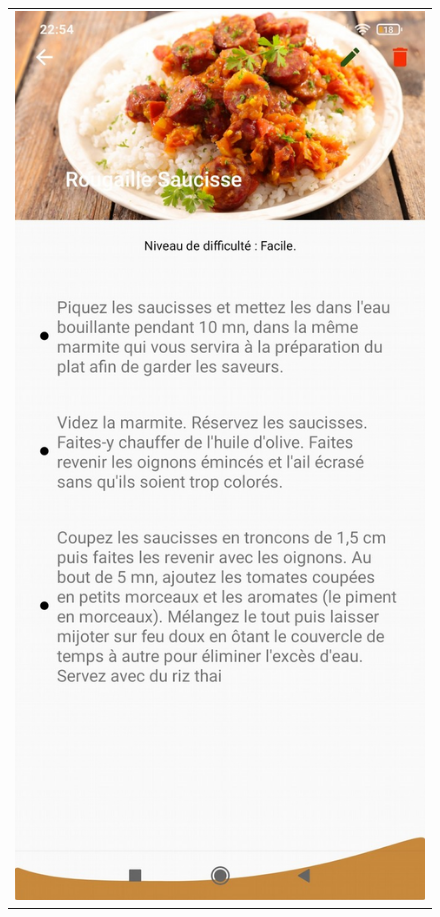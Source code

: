 \documentclass{article}
\begin{document}
\begin{figure}
\begin{tabular}{@{}c@{}}
    \end{tabular}
    \begin{tabular}{@{}c@{}}
        \includegraphics[scale=0.152]{direction.png}
    \end{tabular}
\end{figure}
\end{document}
